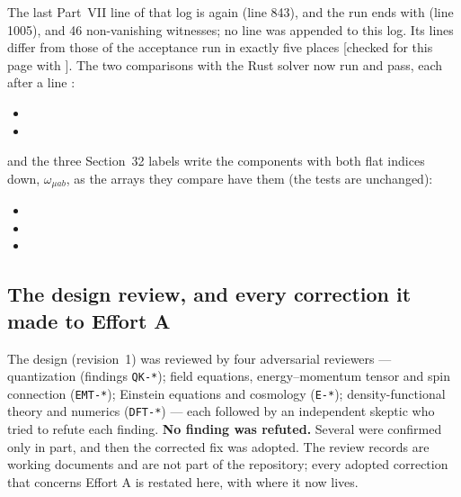 The last Part~VII line of that log is again 
(line 843), and the run ends with  (line 1005),
 and 46 non-vanishing witnesses; no
 line was appended to this log. Its  lines differ from those of the
acceptance run in exactly five places [checked for this page with ]. The two comparisons
with the Rust solver now run and pass, each after a line
:
\begin{itemize}
  \item {}
  \item {}
\end{itemize}
and the three Section~32 labels write the components with both flat indices down, $\omega_{\mu ab}$,
as the arrays they compare have them (the tests are unchanged):
\begin{itemize}
  \item {}
  \item {}
  \item {}
\end{itemize}

\subsection{The design review, and every correction it made to Effort A}
\label{sec:10.4}

The design (revision~1) was reviewed by four adversarial reviewers --- quantization (findings
\texttt{QK-*}); field equations, energy--momentum tensor and spin connection (\texttt{EMT-*}); Einstein
equations and cosmology (\texttt{E-*}); density-functional theory and numerics (\texttt{DFT-*}) ---
each followed by an independent skeptic who tried to refute each finding. \textbf{No finding was
refuted.} Several were confirmed only in part, and then the corrected fix was adopted. The review
records are working documents and are not part of the repository; every adopted correction that
concerns Effort A is restated here, with where it now lives.

